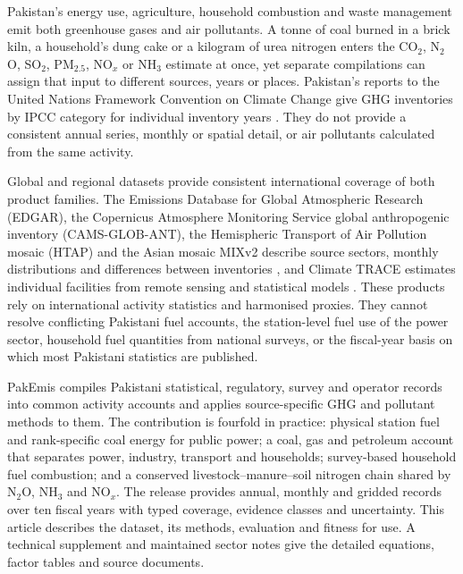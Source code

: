 \documentclass[essd,manuscript]{copernicus}
\begin{document}
\introduction
Pakistan's energy use, agriculture, household combustion and waste management emit both greenhouse gases and air pollutants. A tonne of coal burned in a brick kiln, a household's dung cake or a kilogram of urea nitrogen enters the CO$_2$, N$_2$O, SO$_2$, PM$_{2.5}$, NO$_x$ or NH$_3$ estimate at once, yet separate compilations can assign that input to different sources, years or places. Pakistan's reports to the United Nations Framework Convention on Climate Change give GHG inventories by IPCC category for individual inventory years \citep{PakistanBUR2022,PakistanBTR2024,PakistanCRT2026}. They do not provide a consistent annual series, monthly or spatial detail, or air pollutants calculated from the same activity.

Global and regional datasets provide consistent international coverage of both product families. The Emissions Database for Global Atmospheric Research (EDGAR), the Copernicus Atmosphere Monitoring Service global anthropogenic inventory (CAMS-GLOB-ANT), the Hemispheric Transport of Air Pollution mosaic (HTAP) and the Asian mosaic MIXv2 describe source sectors, monthly distributions and differences between inventories \citep{EDGAR2025,EDGARAP81,CAMS2024,HTAP2025,MIX2024}, and Climate TRACE estimates individual facilities from remote sensing and statistical models \citep{ClimateTRACE2026}. These products rely on international activity statistics and harmonised proxies. They cannot resolve conflicting Pakistani fuel accounts, the station-level fuel use of the power sector, household fuel quantities from national surveys, or the fiscal-year basis on which most Pakistani statistics are published.

PakEmis compiles Pakistani statistical, regulatory, survey and operator records into common activity accounts and applies source-specific GHG and pollutant methods to them. The contribution is fourfold in practice: physical station fuel and rank-specific coal energy for public power; a coal, gas and petroleum account that separates power, industry, transport and households; survey-based household fuel combustion; and a conserved livestock--manure--soil nitrogen chain shared by N$_2$O, NH$_3$ and NO$_x$. The release provides annual, monthly and gridded records over ten fiscal years with typed coverage, evidence classes and uncertainty. This article describes the dataset, its methods, evaluation and fitness for use. A technical supplement and maintained sector notes give the detailed equations, factor tables and source documents.
\end{document}
